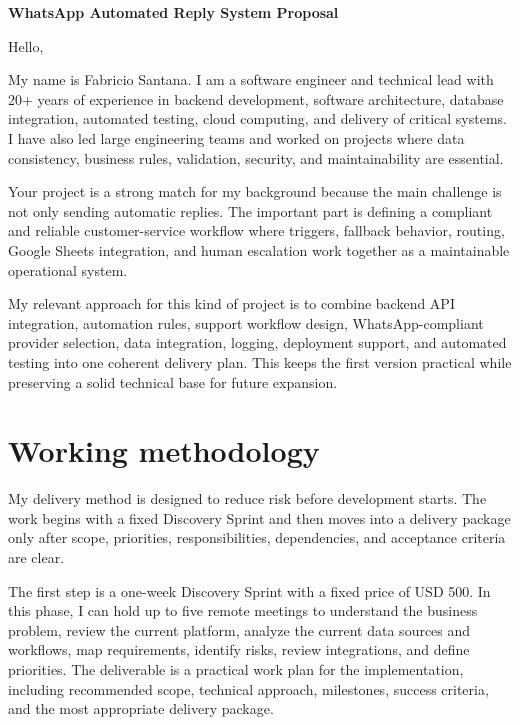 \documentclass[11pt,a4paper]{article}
\begin{document}
\begin{center}
{\LARGE\bfseries WhatsApp Automated Reply System Proposal}
\end{center}
\vspace{0.5em}

Hello,\par

My name is Fabricio Santana. I am a software engineer and technical lead with 20+ years of experience in backend development, software architecture, database integration, automated testing, cloud computing, and delivery of critical systems. I have also led large engineering teams and worked on projects where data consistency, business rules, validation, security, and maintainability are essential.\par

Your project is a strong match for my background because the main challenge is not only sending automatic replies. The important part is defining a compliant and reliable customer-service workflow where triggers, fallback behavior, routing, Google Sheets integration, and human escalation work together as a maintainable operational system.\par

My relevant approach for this kind of project is to combine backend API integration, automation rules, support workflow design, WhatsApp-compliant provider selection, data integration, logging, deployment support, and automated testing into one coherent delivery plan. This keeps the first version practical while preserving a solid technical base for future expansion.\par

\section*{Working methodology}

My delivery method is designed to reduce risk before development starts. The work begins with a fixed Discovery Sprint and then moves into a delivery package only after scope, priorities, responsibilities, dependencies, and acceptance criteria are clear.\par

The first step is a one-week Discovery Sprint with a fixed price of USD 500. In this phase, I can hold up to five remote meetings to understand the business problem, review the current platform, analyze the current data sources and workflows, map requirements, identify risks, review integrations, and define priorities. The deliverable is a practical work plan for the implementation, including recommended scope, technical approach, milestones, success criteria, and the most appropriate delivery package.\par
\end{document}
